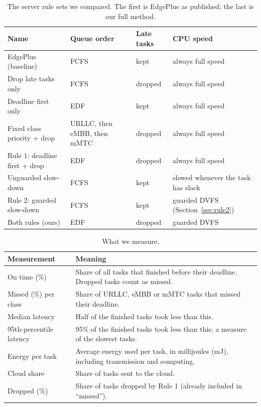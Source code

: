 \documentclass[11pt]{article}
\newcommand{\botrule}{\bottomrule}
\theoremstyle{definition}
\begin{document}
\begin{table}[!htbp]
\caption{The server rule sets we compared. The first is EdgePlus as published; the last is our full method.}
\label{tab:variants}
\small
\begin{tabularx}{\textwidth}{@{}lLlL@{}}
\toprule
Name & Queue order & Late tasks & CPU speed\\
\midrule
EdgePlus (baseline) & FCFS & kept & always full speed\\
Drop late tasks only & FCFS & dropped & always full speed\\
Deadline first only & EDF & kept & always full speed\\
Fixed class priority + drop & URLLC, then eMBB, then mMTC & dropped & always full speed\\
Rule 1: deadline first + drop & EDF & dropped & always full speed\\
Unguarded slow-down & FCFS & kept & slowed whenever the task has slack\\
Rule 2: guarded slow-down & FCFS & kept & guarded DVFS (Section~\ref{sec:rule2})\\
Both rules (ours) & EDF & dropped & guarded DVFS\\
\botrule
\end{tabularx}
\end{table}

\begin{table}[!htbp]
\caption{What we measure.}
\label{tab:metrics}
\small
\begin{tabularx}{\textwidth}{lL}
\toprule
Measurement & Meaning\\
\midrule
On time (\%) & Share of all tasks that finished before their deadline. Dropped tasks count as missed.\\
Missed (\%) per class & Share of URLLC, eMBB or mMTC tasks that missed their deadline.\\
Median latency & Half of the finished tasks took less than this.\\
95th-percentile latency & 95\% of the finished tasks took less than this; a measure of the slowest tasks.\\
Energy per task & Average energy used per task, in millijoules (mJ), including transmission and computing.\\
Cloud share & Share of tasks sent to the cloud.\\
Dropped (\%) & Share of tasks dropped by Rule 1 (already included in ``missed'').\\
\botrule
\end{tabularx}
\end{table}
\end{document}
